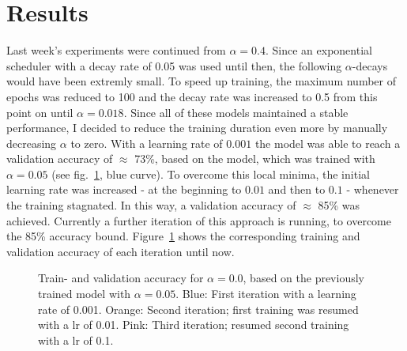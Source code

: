 \documentclass[10pt,twocolumn,letterpaper]{article}
\begin{document}
\section{Results}
Last week's experiments were continued from $\alpha=0.4$.
Since an exponential scheduler with a decay rate of 0.05 was used until then, the following $\alpha$-decays would have been extremly small.
To speed up training, the maximum number of epochs was reduced to 100 and the decay rate was increased to 0.5 from this point on until $\alpha=0.018$.
Since all of these models maintained a stable performance, I decided to reduce the training duration even more by manually decreasing $\alpha$ to zero.
With a learning rate of $0.001$ the model was able to reach a validation accuracy of $\approx$ 73\%, based on the model, which was trained with $\alpha=0.05$ (see fig.~\ref{fig:final}, blue curve).
To overcome this local minima, the initial learning rate was increased - at the beginning to $0.01$ and then to $0.1$ - whenever the training stagnated.
In this way, a validation accuracy of $\approx$ 85\% was achieved.
Currently a further iteration of this approach is running, to overcome the 85\% accuracy bound.
Figure~\ref{fig:final} shows the corresponding training and validation accuracy of each iteration until now.
\begin{figure}[hpbt]
	\centering
	\centering
	\hspace{0.1\textwidth}
	\caption[]{Train- and validation accuracy for $\alpha=0.0$, based on the previously trained model with $\alpha=0.05$.
		Blue: First iteration with a learning rate of 0.001.
		Orange: Second iteration; first training was resumed with a lr of 0.01.
		Pink: Third iteration; resumed second training with a lr of 0.1.}
	\label{fig:final}
\end{figure}
\end{document}
